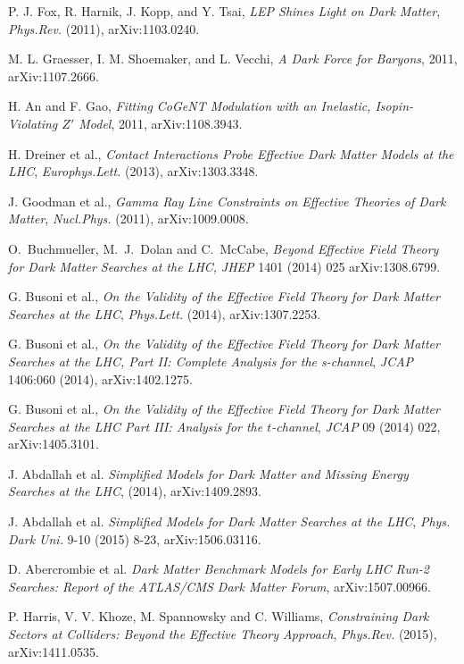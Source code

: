  P. J. Fox, R. Harnik, J. Kopp, and Y. Tsai, \emph{LEP Shines Light on Dark Matter}, \emph{Phys.Rev.} (2011), arXiv:1103.0240.

 M. L. Graesser, I. M. Shoemaker, and L. Vecchi, \emph{A Dark Force for Baryons}, 2011, arXiv:1107.2666.

 H. An and F. Gao, \emph{Fitting CoGeNT Modulation with an Inelastic, Isopin-Violating $Z'$ Model}, 2011, arXiv:1108.3943.

 H. Dreiner et al., \emph{Contact Interactions Probe Effective Dark Matter Models at the LHC}, \emph{Europhys.Lett.} (2013), arXiv:1303.3348.

 J. Goodman et al., \emph{Gamma Ray Line Constraints on Effective Theories of Dark Matter}, \emph{Nucl.Phys.} (2011), arXiv:1009.0008.

 O.~Buchmueller, M.~J.~Dolan and C.~McCabe,
  \emph{Beyond Effective Field Theory for Dark Matter Searches at the LHC,}
  \emph{JHEP}   1401 (2014) 025
  arXiv:1308.6799.

 G. Busoni et al., \emph{On the Validity of the Effective Field Theory for Dark Matter Searches at the LHC}, \emph{Phys.Lett.} (2014), arXiv:1307.2253.

 G. Busoni et al., \emph{On the Validity of the Effective Field Theory for Dark Matter Searches at the LHC, Part II: Complete Analysis for the s-channel}, \emph{JCAP} 1406:060 (2014), arXiv:1402.1275.

 G. Busoni et al., \emph{On the Validity of the Effective Field Theory for Dark Matter Searches at the LHC Part III: Analysis for the $t$-channel}, \emph{JCAP} 09 (2014) 022, arXiv:1405.3101.

 J. Abdallah et al. \emph{Simplified Models for Dark Matter and Missing Energy Searches at the LHC}, (2014), arXiv:1409.2893.

 J. Abdallah et al. \emph{Simplified Models for Dark Matter Searches at the LHC}, \emph{Phys. Dark Uni.} 9-10 (2015) 8-23, arXiv:1506.03116.

 D. Abercrombie et al. \emph{Dark Matter Benchmark Models for Early LHC Run-2 Searches: Report of the ATLAS/CMS Dark Matter Forum}, arXiv:1507.00966.

 P. Harris, V. V. Khoze, M. Spannowsky and C. Williams, \emph{Constraining Dark Sectors at Colliders: Beyond the Effective Theory Approach}, \emph{Phys.Rev.} (2015), arXiv:1411.0535.

